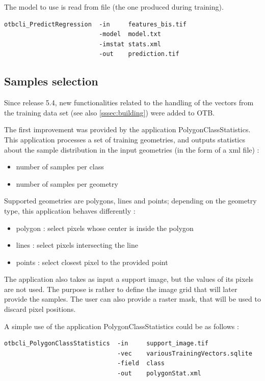 The model to use is read from file (the one produced during training).

\begin{verbatim}
otbcli_PredictRegression  -in     features_bis.tif
                          -model  model.txt
                          -imstat stats.xml
                          -out    prediction.tif
\end{verbatim}



\subsection{Samples selection}\label{ssec:samplesselect}

Since release 5.4, new functionalities related to the handling of the vectors from the training data set (see also \ref{sssec:building}) were added to OTB.

The first improvement was provided by the application PolygonClassStatistics. This application processes a set of training geometries, 
and outputs statistics about the sample distribution in the input geometries (in the form of a xml file) :
\begin{itemize}
\item number of samples per class
\item number of samples per geometry
\end{itemize}

Supported geometries are polygons, lines and points; depending on the geometry type, this application behaves differently : 
\begin{itemize}
\item polygon : select pixels whose center is inside the polygon
\item lines : select pixels intersecting the line
\item points : select closest pixel to the provided point
\end{itemize}
The application also takes as input a support image, but the values of its pixels are not used.
The purpose is rather to define the image grid that will later provide the samples.
The user can also provide a raster mask, that will be used to discard pixel positions.

A simple use of the application PolygonClassStatistics could be as follows :
\begin{verbatim}
otbcli_PolygonClassStatistics  -in     support_image.tif
                               -vec    variousTrainingVectors.sqlite
                               -field  class
                               -out    polygonStat.xml
\end{verbatim}

